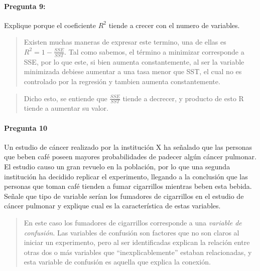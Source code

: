 \documentclass[]{article}
\let\oldparagraph\paragraph
\renewcommand{\paragraph}[1]{\oldparagraph{#1}\mbox{}}
\begin{document}
\hypertarget{pregunta-9}{%
\paragraph{\texorpdfstring{\textbf{Pregunta
9:}}{Pregunta 9:}}\label{pregunta-9}}

Explique porque el coeficiente \(R^2\) tiende a crecer con el numero de
variables.

\begin{quote}
Existen muchas maneras de expresar este termino, una de ellas es
\(R^{2} = 1 - \frac{SSE}{SST}\). Tal como sabemos, el término a
minimizar corresponde a SSE, por lo que este, si bien aumenta
constantemente, al ser la variable minimizada debiese aumentar a una
tasa menor que SST, el cual no es controlado por la regresión y tambien
aumenta constantemente.
\end{quote}

\begin{quote}
Dicho esto, se entiende que \(\frac{SSE}{SST}\) tiende a decrecer, y
producto de esto R tiende a aumentar su valor.
\end{quote}

\hypertarget{pregunta-10}{%
\paragraph{\texorpdfstring{\textbf{Pregunta
10}}{Pregunta 10}}\label{pregunta-10}}

Un estudio de cáncer realizado por la institución X ha señalado que las
personas que beben café poseen mayores probabilidades de padecer algún
cáncer pulmonar. El estudio causo un gran revuelo en la población, por
lo que una segunda institución ha decidido replicar el experimento,
llegando a la conclusión que las personas que toman café tienden a fumar
cigarrillos mientras beben esta bebida. Señale que tipo de variable
serían los fumadores de cigarrillos en el estudio de cáncer pulmonar y
explique cual es la característica de estas variables.

\begin{quote}
En este caso los fumadores de cigarrillos corresponde a una
\emph{variable de confusión}. Las variables de confusión son factores
que no son claros al iniciar un experimento, pero al ser identificadas
explican la relación entre otras dos o más variables que
``inexplicablemente'' estaban relacionadas, y esta variable de confusión
es aquella que explica la conexión.
\end{quote}
\end{document}
